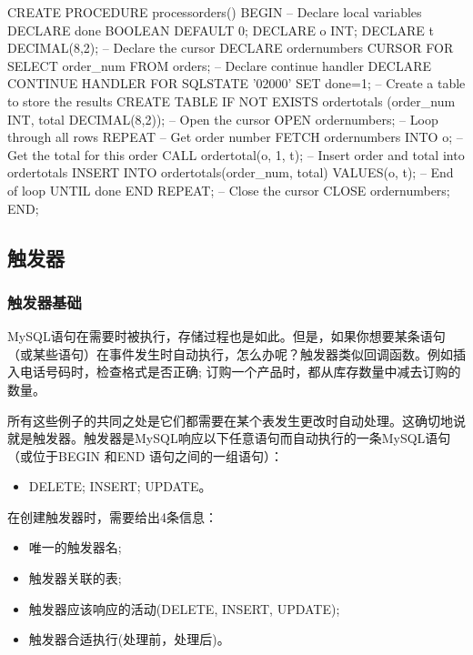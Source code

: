 \begin{sql}
CREATE PROCEDURE processorders()
BEGIN
   -- Declare local variables
   DECLARE done BOOLEAN DEFAULT 0;
   DECLARE o INT;
   DECLARE t DECIMAL(8,2);
   -- Declare the cursor
   DECLARE ordernumbers CURSOR
   FOR
   SELECT order_num FROM orders;
   -- Declare continue handler
   DECLARE CONTINUE HANDLER FOR SQLSTATE '02000' SET done=1;
   -- Create a table to store the results
   CREATE TABLE IF NOT EXISTS ordertotals
      (order_num INT, total DECIMAL(8,2));
   -- Open the cursor
   OPEN ordernumbers;
   -- Loop through all rows
   REPEAT
      -- Get order number
      FETCH ordernumbers INTO o;
      -- Get the total for this order
      CALL ordertotal(o, 1, t);
      -- Insert order and total into ordertotals
      INSERT INTO ordertotals(order_num, total)
      VALUES(o, t);
   -- End of loop
   UNTIL done END REPEAT;
   -- Close the cursor
   CLOSE ordernumbers;
END;
\end{sql}

\subsection{触发器}

\subsubsection{触发器基础}

MySQL语句在需要时被执行，存储过程也是如此。但是，如果你想要某条语句（或某些语句）在事件发生时自动执行，怎么办呢？触发器类似回调函数。例如插入电话号码时，检查格式是否正确; 订购一个产品时，都从库存数量中减去订购的数量。

所有这些例子的共同之处是它们都需要在某个表发生更改时自动处理。这确切地说就是触发器。触发器是MySQL响应以下任意语句而自动执行的一条MySQL语句（或位于BEGIN 和END 语句之间的一组语句）：

\begin{itemize}
    \item DELETE; INSERT; UPDATE。
\end{itemize}

在创建触发器时，需要给出4条信息：
\begin{itemize}
    \item 唯一的触发器名;
    \item 触发器关联的表;
    \item 触发器应该响应的活动(DELETE, INSERT, UPDATE);
    \item 触发器合适执行(处理前，处理后)。
\end{itemize}

